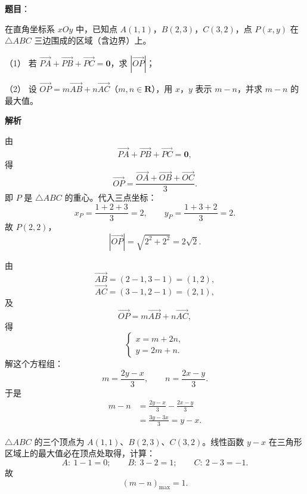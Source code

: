 \begin{answer}

\textbf{题目}：

在直角坐标系 $xOy$ 中，已知点 $A(1,1)$，$B(2,3)$，$C(3,2)$，点 $P(x,y)$ 在 $\triangle ABC$ 三边围成的区域（含边界）上。

（1） 若 $\overrightarrow{PA}+\overrightarrow{PB}+\overrightarrow{PC}=\boldsymbol 0$，求 $|\overrightarrow{OP}|$；

（2） 设 $\overrightarrow{OP}=m\overrightarrow{AB}+n\overrightarrow{AC}$（$m,n\in\mathbf R$），用 $x$，$y$ 表示 $m-n$，并求 $m-n$ 的最大值。

\textbf{解析}


由
\nopagebreak[4]
\[\overrightarrow{PA}+\overrightarrow{PB}+\overrightarrow{PC}=\boldsymbol 0,\]
得
\nopagebreak[4]
\[\overrightarrow{OP}=\frac{\overrightarrow{OA}+\overrightarrow{OB}+\overrightarrow{OC}}3.\]
即 $P$ 是 $\triangle ABC$ 的重心。代入三点坐标：
\nopagebreak[4]
\[x_P=\frac{1+2+3}{3}=2,\qquad y_P=\frac{1+3+2}{3}=2.\]
故 $P(2,2)$，
\nopagebreak[4]
\[|\overrightarrow{OP}|=\sqrt{2^2+2^2}=2\sqrt2.\]


由
\nopagebreak[4]
\[\overrightarrow{AB}=(2-1,3-1)=(1,2),\]
\nopagebreak[4]
\[\overrightarrow{AC}=(3-1,2-1)=(2,1),\]
及
\nopagebreak[4]
\[\overrightarrow{OP}=m\overrightarrow{AB}+n\overrightarrow{AC},\]
得
\nopagebreak[4]
\[\begin{cases}
x=m+2n,\\
y=2m+n.
\end{cases}\]
解这个方程组：
\nopagebreak[4]
\[m=\frac{2y-x}{3},\qquad n=\frac{2x-y}{3}.\]
于是
\nopagebreak[4]
\[\begin{aligned}
m-n&=\frac{2y-x}{3}-\frac{2x-y}{3}\\
&=\frac{3y-3x}{3}=y-x.
\end{aligned}\]

$\triangle ABC$ 的三个顶点为 $A(1,1)$、$B(2,3)$、$C(3,2)$。线性函数 $y-x$ 在三角形区域上的最大值必在顶点处取得，计算：
\nopagebreak[4]
\[A:\ 1-1=0;\qquad B:\ 3-2=1;\qquad C:\ 2-3=-1.\]
故
\nopagebreak[4]
\[(m-n)_{\max}=1.\]



\end{answer}
